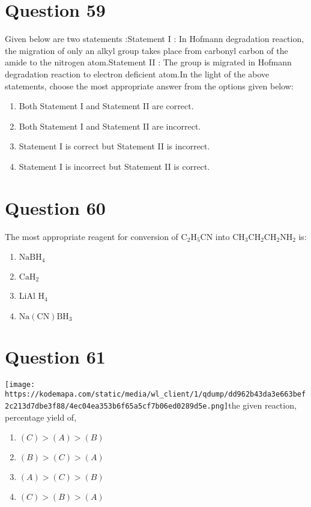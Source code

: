 \documentclass{article}
\begin{document}
\section*{Question 59}
Given below are two statements :Statement I : In Hofmann degradation reaction, the migration of only an alkyl group takes place from carbonyl carbon of the amide to the nitrogen atom.Statement II : The group is migrated in Hofmann degradation reaction to electron deficient atom.In the light of the above statements, choose the most appropriate answer from the options given below: 
\begin{enumerate}[label=(\alph*)]
\item Both Statement I and Statement II are correct.
\item Both Statement I and Statement II are incorrect.
\item Statement I is correct but Statement II is incorrect.
\item Statement I is incorrect but Statement II is correct.
\end{enumerate}
\newpage
\section*{Question 60}
The most appropriate reagent for conversion of \(\mathrm{C}_2 \mathrm{H}_5 \mathrm{CN}\) into \(\mathrm{CH}_3 \mathrm{CH}_2 \mathrm{CH}_2 \mathrm{NH}_2\) is:
\begin{enumerate}[label=(\alph*)]
\item \(\mathrm{NaBH}_4\)
\item \(\mathrm{CaH}_2\)
\item LiAl H\(_4\)
\item \(\mathrm{Na}(\mathrm{CN}) \mathrm{BH}_3\)
\end{enumerate}
\newpage
\section*{Question 61}
\texttt{[image: https://kodemapa.com/static/media/wl\_client/1/qdump/dd962b43da3e663bef2c213d7dbe3f88/4ec04ea353b6f65a5cf7b06ed0289d5e.png]}\newlineConsider the given reaction, percentage yield of, 
\begin{enumerate}[label=(\alph*)]
\item \((C)>(A)>(B)\)
\item \((B)>(C)>(A)\)
\item \((A)>(C)>(B)\)
\item \((C)>(B)>(A)\)
\end{enumerate}
\newpage
\end{document}
